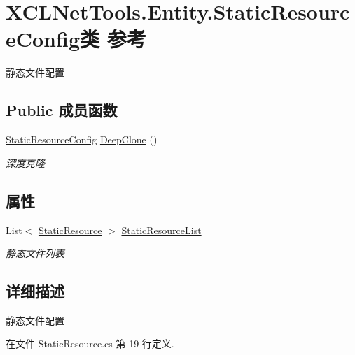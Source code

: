 \hypertarget{class_x_c_l_net_tools_1_1_entity_1_1_static_resource_config}{}\section{X\+C\+L\+Net\+Tools.\+Entity.\+Static\+Resource\+Config类 参考}
\label{class_x_c_l_net_tools_1_1_entity_1_1_static_resource_config}


静态文件配置  


\subsection*{Public 成员函数}
\begin{DoxyCompactItemize}
\item 
\hyperlink{class_x_c_l_net_tools_1_1_entity_1_1_static_resource_config}{Static\+Resource\+Config} \hyperlink{class_x_c_l_net_tools_1_1_entity_1_1_static_resource_config_a488ef1a24b5a4be8cdfc93610cc8bb31}{Deep\+Clone} ()
\begin{DoxyCompactList}\small\item\em 深度克隆 \end{DoxyCompactList}\end{DoxyCompactItemize}
\subsection*{属性}
\begin{DoxyCompactItemize}
\item 
List$<$ \hyperlink{class_x_c_l_net_tools_1_1_entity_1_1_static_resource}{Static\+Resource} $>$ \hyperlink{class_x_c_l_net_tools_1_1_entity_1_1_static_resource_config_a4525e28db253a1da329b5ebd1982f04d}{Static\+Resource\+List}
\begin{DoxyCompactList}\small\item\em 静态文件列表 \end{DoxyCompactList}\end{DoxyCompactItemize}


\subsection{详细描述}
静态文件配置 



在文件 Static\+Resource.\+cs 第 19 行定义.



